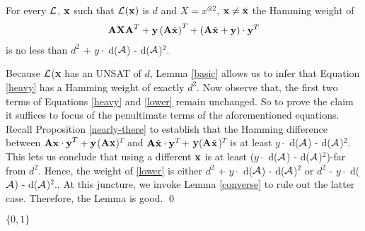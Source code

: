{\begin{lemma}\label{towards}
  For every ${\cal L}$, ${\bf x}$ such that ${\cal L}({\bf x})$ is $d$ and $X
  = x^{\otimes 2}$, ${\bf x} \ne \tilde{\bf x}$ the Hamming weight of
\begin{align}\label{lower}
{\bf AXA}^T + {\bf y}\left({\bf A} \tilde{\bf x}\right)^T + \left({\bf A} \tilde{\bf x} + {\bf y} \right)\cdot {\bf y}^T
\end{align}
is no less than $d^2$ + $y \cdot$ d(${\cal A}$) - d(${\cal A}$)$^2$.
\end{lemma}
 Because ${\cal L}$({\bf x} has an UNSAT of $d$,
Lemma \ref{basic} allows us to infer that Equation \eqref{heavy} has a
Hamming weight of exactly $d^2$. Now observe that, the first two terms
of Equations \eqref{heavy} and \eqref{lower} remain unchanged. So to
prove the claim it suffices to focus of the penultimate terms of the
aforementioned equations. Recall Proposition \ref{nearly-there} to
establish that the Hamming difference between ${\bf Ax\cdot y}^T +
{\bf y}$({\bf Ax})$^T$ and ${\bf A} \tilde{\bf x}\cdot {\bf y}^T$+
{\bf y}({\bf A}$\tilde{\bf x}$)$^T$ is at least $y \cdot$ d(${\cal A}$) -
d(${\cal A}$)$^2$.  This lets us conclude that using a different ${\bf x}$
is at least ($y \cdot$ d(${\cal A}$) - d(${\cal A}$)$^2$)-far from $d^2$. Hence,
the weight of \eqref{lower} is either $d^2$ + $y \cdot$ d(${\cal A}$) -
d(${\cal A}$)$^2$ or $d^2$ - $y \cdot$ d(${\cal A}$) - d(${\cal A}$)$^2$..  At this
juncture, we invoke Lemma \ref{converse} to rule out the latter case.
Therefore, the Lemma is good. \qed



$\{0,1\}$ 
}


